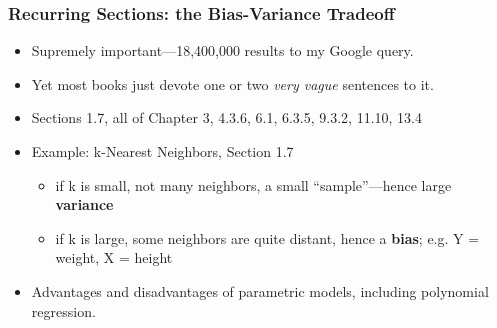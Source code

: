 \documentclass{beamer}
\begin{document}
\begin{frame} 
\frametitle{Recurring Sections: the Bias-Variance Tradeoff}

\begin{itemize}

\item Supremely important---18,400,000 results to my Google query.

\item Yet most books just devote one or two \textit{very vague}
sentences to it.

\item Sections 1.7, all of Chapter 3, 4.3.6, 6.1, 6.3.5, 9.3.2, 11.10, 13.4

\item Example: k-Nearest Neighbors, Section 1.7

\begin{itemize}

\item if k is small, not many neighbors, a small ``sample''---hence large
\textbf{variance} 

\item if k is large, some neighbors are quite distant,
hence a \textbf{bias}; e.g. Y = weight, X = height

\end{itemize} 

\item Advantages and disadvantages of parametric models, including
polynomial regression.

\end{itemize} 

\end{frame} 
\end{document}

